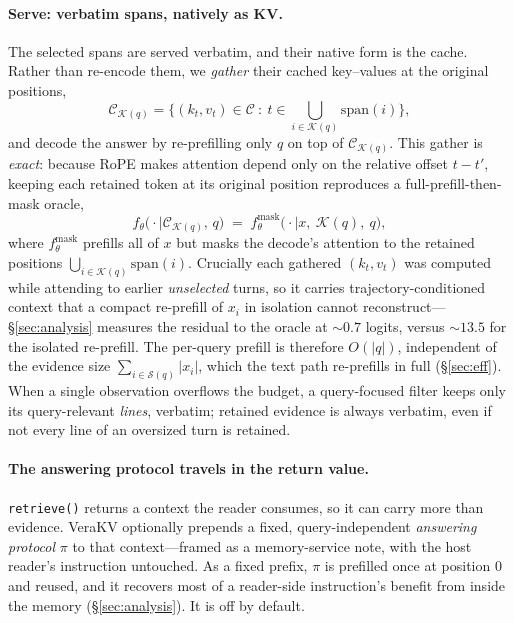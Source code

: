 \documentclass{article} %
\newcommand{\kvm}{VeraKV}
\begin{document}
\paragraph{Serve: verbatim spans, natively as KV.} The selected spans are served
verbatim, and their native form is the cache. Rather than re-encode them, we
\emph{gather} their cached key--values at the original positions,
\[
  \mathcal{C}_{\mathcal{K}(q)}=\Big\{(k_t,v_t)\in\mathcal{C}\ :\ t\in\textstyle\bigcup_{i\in\mathcal{K}(q)}\mathrm{span}(i)\Big\},
\]
and decode the answer by re-prefilling only $q$ on top of
$\mathcal{C}_{\mathcal{K}(q)}$. This gather is \emph{exact}: because RoPE makes
attention depend only on the relative offset $t-t'$, keeping each retained token
at its original position reproduces a full-prefill-then-mask oracle,
\[
  f_\theta\big(\cdot\mid \mathcal{C}_{\mathcal{K}(q)},\,q\big)
  \;=\;
  f_\theta^{\mathrm{mask}}\big(\cdot\mid x,\ \mathcal{K}(q),\ q\big),
\]
where $f_\theta^{\mathrm{mask}}$ prefills all of $x$ but masks the decode's
attention to the retained positions $\bigcup_{i\in\mathcal{K}(q)}\mathrm{span}(i)$.
Crucially each gathered $(k_t,v_t)$ was computed while attending to earlier
\emph{unselected} turns, so it carries trajectory-conditioned context that a
compact re-prefill of $x_i$ in isolation cannot reconstruct---\S\ref{sec:analysis}
measures the residual to the oracle at $\sim\!0.7$ logits, versus $\sim\!13.5$ for
the isolated re-prefill. The per-query prefill is therefore $O(|q|)$, independent
of the evidence size $\sum_{i\in\mathcal{S}(q)}|x_i|$, which the text path
re-prefills in full (\S\ref{sec:eff}). When a single observation overflows the
budget, a query-focused filter keeps only its query-relevant \emph{lines},
verbatim; retained evidence is always verbatim, even if not every line of an
oversized turn is retained.

\paragraph{The answering protocol travels in the return value.}
\texttt{retrieve()} returns a context the reader consumes, so it can carry more
than evidence. \kvm{} optionally prepends a fixed, query-independent
\emph{answering protocol} $\pi$ to that context---framed as a memory-service
note, with the host reader's instruction untouched. As a fixed prefix, $\pi$ is
prefilled once at position $0$ and reused, and it recovers most of a reader-side
instruction's benefit from inside the memory (\S\ref{sec:analysis}). It is off by
default.
\end{document}
